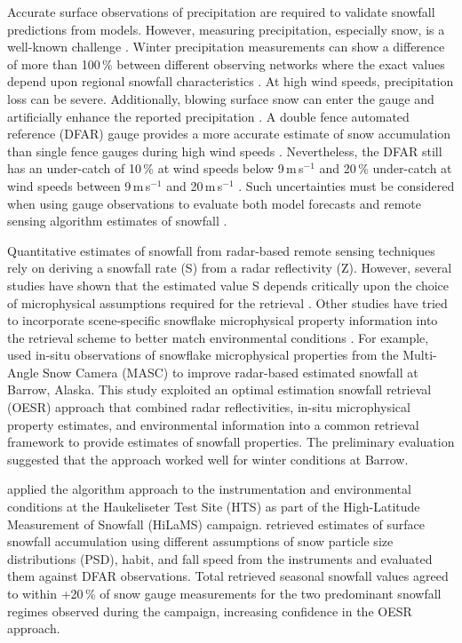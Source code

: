 \documentclass{ametsocV5}
\begin{document}
    Accurate surface observations of precipitation are required to validate snowfall predictions from models. However, measuring precipitation, especially snow, is a well-known challenge \citep{theriault_dependence_2012,wolff_measurements_2013,colli_improved_2015}.  Winter precipitation measurements can show a difference of more than 100\,\% between different observing networks where the exact values depend upon regional snowfall characteristics \citep{kochendorfer_analysis_2017}. At high wind speeds, precipitation loss can be severe. Additionally, blowing surface snow can enter the gauge and artificially enhance the reported precipitation \citep{nitu_iom_2018}. A double fence automated reference (DFAR) gauge provides a more accurate estimate of snow accumulation than single fence gauges during high wind speeds \citep{wolff_derivation_2015,kochendorfer_analysis_2017}. Nevertheless, the DFAR still has an under-catch of 10\,\% at wind speeds below 9\,m\,s$^{-1}$ and 20\,\% under-catch at wind speeds between 9\,m\,s$^{-1}$ and 20\,m\,s$^{-1}$ \citep{nitu_iom_2018}. Such uncertainties must be considered when using gauge observations to evaluate both model forecasts and remote sensing algorithm estimates of snowfall \citep{wolff_derivation_2015}. 
    
    Quantitative estimates of snowfall from radar-based remote sensing techniques rely on deriving a snowfall rate (S) from a radar reflectivity (Z). However, several studies have shown that the estimated value S depends critically upon the choice of microphysical assumptions required for the retrieval \citep{kulie_utilizing_2009,friedrich_quantifying_2020}. Other studies have tried to incorporate scene-specific snowflake microphysical property information into the retrieval scheme to better match environmental conditions \citep{wood_microphysical_2015}. For example, \citet{cooper_variational_2017} used in-situ observations of snowflake microphysical properties from the Multi-Angle Snow Camera (MASC) to improve radar-based estimated snowfall at Barrow, Alaska. This study exploited an optimal estimation snowfall retrieval (OESR) approach that combined radar reflectivities, in-situ microphysical property estimates, and environmental information into a common retrieval framework to provide estimates of snowfall properties. The preliminary evaluation suggested that the approach worked well for winter conditions at Barrow.
    
    \citet{schirle_estimation_2019} applied the \citet{cooper_variational_2017} algorithm approach to the instrumentation and environmental conditions at the Haukeliseter Test Site (HTS) as part of the High-Latitude Measurement of Snowfall (HiLaMS) campaign. \citet{schirle_estimation_2019} retrieved estimates of surface
	snowfall accumulation using different assumptions of snow particle size distributions (PSD), habit, and fall speed from the instruments and evaluated them against DFAR observations. Total retrieved seasonal snowfall values agreed to within +20\,\% of snow gauge measurements for the two predominant snowfall regimes observed during the campaign, increasing confidence in the OESR approach. 
    
\end{document}

